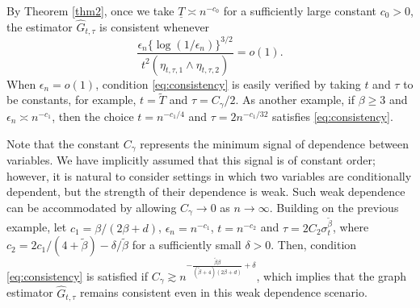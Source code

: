 \documentclass[11pt,a4paper,final]{article}
\numberwithin{equation}{section}
\theoremstyle{remark}
\def\cF{\mathcal F}
\newcommand{\bff}{{\bf f}}
\newcommand{\be}{\begin{equation}}
\newcommand{\ee}{\end{equation}}
\begin{document}
By Theorem \ref{thm2}, once we take $\underline{T} \asymp n^{-c_{0}}$ for a sufficiently large constant $c_{0} > 0$, the estimator $\widehat G_{t, \tau}$ is consistent whenever
\be
\frac{\epsilon_n \{\log(1/\epsilon_n)\}^{3/2}}{t^2 ( \eta_{t,\tau,1} \wedge \eta_{t,\tau,2} )}=o(1).
\label{eq:consistency}
\ee
When $\epsilon_{n} = o(1)$, condition \eqref{eq:consistency} is easily verified by taking $t$ and $\tau$ to be constants, for example, $t = {\widetilde T}$ and $\tau = C_{\gamma}/2$.
As another example, if $\beta \geq 3$ and $\epsilon_{n} \asymp n^{-c_{1}}$, then the choice $t = n^{-c_{1}/4}$ and $\tau = 2n^{-c_{1}/32}$ satisfies \eqref{eq:consistency}.



Note that the constant $C_{\gamma}$ represents the minimum signal of dependence between variables.
We have implicitly assumed that this signal is of constant order; however, it is natural to consider settings in which two variables are conditionally dependent, but the strength of their dependence is weak. Such weak dependence can be accommodated by allowing $C_{\gamma} \to 0$ as $n \rightarrow \infty$.
Building on the previous example, let $c_{1} = \beta/(2\beta+d)$, $\epsilon_{n} = n^{-c_{1}}$, $t = n^{-c_{2}}$ and $\tau = 2 C_{2} \sigma_{t}^{\widetilde \beta}$, where $c_{2} = 2 c_{1}/(4 + \widetilde \beta) - \delta/\widetilde \beta$ for a sufficiently small $\delta > 0$.
Then, condition \eqref{eq:consistency} is satisfied if $ C_{\gamma} 
\gtrsim n^{-\frac{\tilde \beta \beta}{(\tilde \beta + 4)(2\beta + d)} + \delta} $, which implies that the graph estimator $\widehat G_{t,\tau}$ remains consistent even in this weak dependence scenario.
\end{document}
